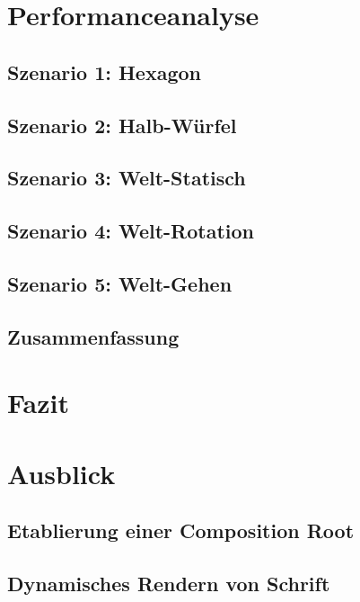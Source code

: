 \documentclass[12pt,a4paper,listof=toc,parskip=half,numbers=noenddot,abstract=true]{scrartcl}
\begin{document}
\clearpage
\section{Performanceanalyse}\label{kap:performance}

\subsection{Szenario 1: Hexagon}

\subsection{Szenario 2: Halb-Würfel}

\subsection{Szenario 3: Welt-Statisch}

\subsection{Szenario 4: Welt-Rotation}

\subsection{Szenario 5: Welt-Gehen}

\subsection{Zusammenfassung}


\clearpage
\section{Fazit}\label{kap:Fazit}

\clearpage
\section{Ausblick}\label{kap:ausblick}

\subsection{Etablierung einer Composition Root}\label{sec:EtablierungEinerKompositionroot}

\subsection{Dynamisches Rendern von Schrift}

\end{document}
